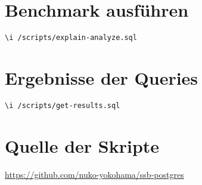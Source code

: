 \section{Benchmark ausführen}
\begin{lstlisting}[language=terminal, caption=Benchmark ausführen, label=code:runbenchmark]
\i /scripts/explain-analyze.sql
\end{lstlisting}

\section{Ergebnisse der Queries}
\begin{lstlisting}[language=terminal, caption=Ergebnisse der Queries abrufen, label=code:getresults]
\i /scripts/get-results.sql
\end{lstlisting}

\section{Quelle der Skripte}
\url{https://github.com/nuko-yokohama/ssb-postgres}~\cite{nukoyokohama_ssb-postgres_2023}
